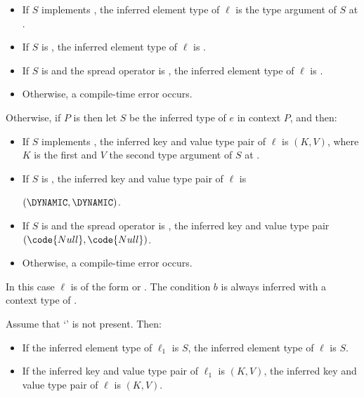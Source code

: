 \documentclass[makeidx]{article}
\begin{document}
{\begin{itemize}
\item
  If $S$ implements ,
  the inferred element type of $\ell$ is
  the type argument of $S$ at .
\item
  If $S$ is \DYNAMIC,
  the inferred element type of $\ell$ is \DYNAMIC.
\item
  If $S$ is  and the spread operator is ,
  the inferred element type of $\ell$ is .
\item
  Otherwise, a compile-time error occurs.
\end{itemize}

\noindent
Otherwise, if $P$ is  then let $S$ be
the inferred type of $e$ in context $P$, and then:

\begin{itemize}
\item
  If $S$ implements ,
  the inferred key and value type pair of $\ell$ is $(K, V)$,
  where $K$ is the first and $V$ the second type argument of
  $S$ at .
\item
  If $S$ is \DYNAMIC,
  the inferred key and value type pair of $\ell$ is

  \noindent
  $(\DYNAMIC, \DYNAMIC)$.
\item
  If $S$ is  and the spread operator is ,
  the inferred key and value type pair $(\code{Null}, \code{Null})$.
\item
  Otherwise, a compile-time error occurs.
\end{itemize}
\vspace{-5mm}
\EndCase

\LMHash{}%
In this case $\ell$ is of the form
 or
.
The condition $b$ is always inferred with a context type of .

Assume that `' is not present. Then:

\begin{itemize}
\item
  If the inferred element type of $\ell_1$ is $S$,
  the inferred element type of $\ell$ is $S$.
\item
  If the inferred key and value type pair of $\ell_1$ is $(K, V)$,
  the inferred key and value type pair of $\ell$ is $(K, V)$.
\end{itemize}

}
\end{document}
